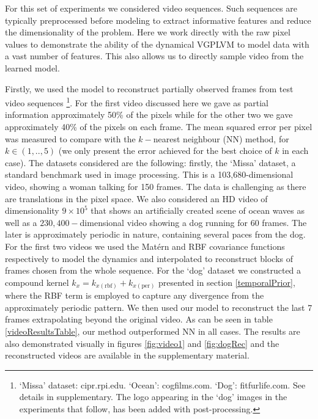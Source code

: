 \documentclass [10pt , a4paper]{article}
\begin{document}
For this set of experiments we considered video sequences. Such
sequences are typically preprocessed before modeling to extract
informative features and reduce the dimensionality of the
problem. Here we work directly with the raw pixel values to
demonstrate the ability of the dynamical VGPLVM to model data with a vast number
of features. This also allows us to directly sample video from the
learned model.
\par Firstly, we used the
model to reconstruct partially observed frames from test video
sequences
\footnote{`Missa' dataset: cipr.rpi.edu. `Ocean': cogfilms.com. `Dog': fitfurlife.com.
  See details in supplementary. The logo appearing in the `dog' images in the experiments that follow,
  has been added with post-processing.}.
For the first video discussed here we gave as partial information approximately 
50\% of the pixels while for the other two we gave approximately 40\% of the pixels on each frame.
The mean squared error per pixel was measured to compare
with the $k-$nearest neighbour (NN) method, for $k \in (1,..,5)$ (we
only present the error achieved for the best choice of $k$ in each
case). The datasets considered are the following: firstly, the `Missa'
dataset, a standard benchmark used in image
processing. This is a 103,680-dimensional video, showing a woman talking
for 150 frames. The data is challenging as there are translations in
the pixel space. We also considered an HD video of dimensionality $9
\times 10^5$ that shows an artificially created scene of ocean waves
as well as a $230,400-$dimensional video showing
a dog running for $60$ frames. The later is approximately periodic in
nature, containing several paces from the dog. For the first two
videos we used the Mat\'ern and RBF covariance functions respectively to model the
dynamics and interpolated to reconstruct blocks of frames chosen from
the whole sequence. For the `dog' dataset we constructed a compound
kernel $k_x = k_{x(\text{rbf})} + k_{x(\text{per})}$ presented in section \ref{temporalPrior}, where the
RBF term is employed to capture any divergence from the approximately
periodic pattern. We then used our model to reconstruct the last 7
frames extrapolating beyond the original video. As can be seen in
table \ref{videoResultsTable}, our method outperformed NN in all
cases. The results are also demonstrated visually in figures
\ref{fig:video1} and \ref{fig:dogRec} and the reconstructed videos are available in the supplementary material.
\end{document}
